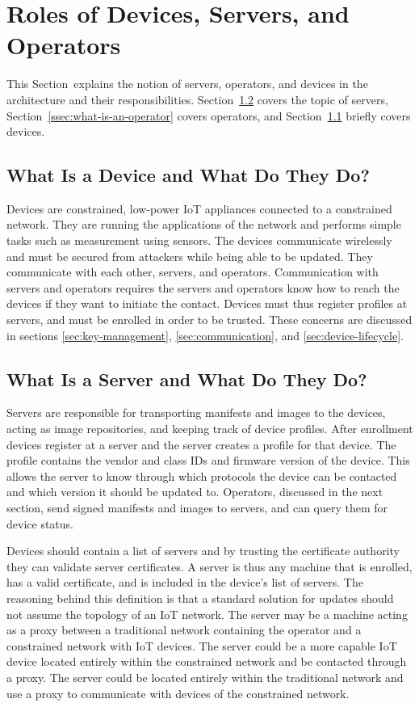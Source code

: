 \documentclass[0-thesis.tex]{subfiles}
\begin{document}
\section{Roles of Devices, Servers, and Operators}
\label{sec:roles}
This Section~explains the notion of servers, operators, and devices in the architecture
and their responsibilities. Section~\ref{ssec:what-is-a-server} covers the topic of
servers, Section~\ref{ssec:what-is-an-operator} covers operators, and
Section~\ref{ssec:what-is-a-device} briefly covers devices.

\subsection{What Is a Device and What Do They Do?}
\label{ssec:what-is-a-device}
Devices are constrained, low-power IoT appliances connected to a constrained network. They
are running the applications of the network and performs simple tasks such as measurement
using sensors. The devices communicate wirelessly and must be secured from attackers while
being able to be updated. They communicate with each other, servers, and operators.
Communication with servers and operators requires the servers and operators know how to
reach the devices if they want to initiate the contact. Devices must thus register
profiles at servers, and must be enrolled in order to be trusted. These concerns are
discussed in sections \ref{sec:key-management}, \ref{sec:communication}, and
\ref{sec:device-lifecycle}.

\subsection{What Is a Server and What Do They Do?}
\label{ssec:what-is-a-server}
Servers are responsible for transporting manifests and images to the devices, acting as
image repositories, and keeping track of device profiles. After enrollment devices
register at a server and the server creates a profile for that device. The profile
contains the vendor and class IDs and firmware version of the device. This allows the
server to know through which protocols the device can be contacted and which version it
should be updated to. Operators, discussed in the next section, send signed manifests and
images to servers, and can query them for device status.

Devices should contain a list of servers and by trusting the certificate authority they
can validate server certificates. A server is thus any machine that is enrolled, has a
valid certificate, and is included in the device's list of servers. The reasoning behind
this definition is that a standard solution for updates should not assume the topology of
an IoT network. The server may be a machine acting as a proxy between a traditional
network containing the operator and a constrained network with IoT devices. The server
could be a more capable IoT device located entirely within the constrained network and be
contacted through a proxy. The server could be located entirely within the traditional
network and use a proxy to communicate with devices of the constrained network.
\end{document}
